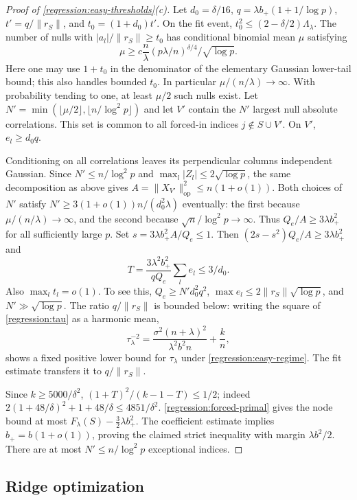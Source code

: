 \begin{proof}[Proof of \cref{regression:easy-thresholds}(c)]
Let $d_0=\delta/16$, $q=\lambda b_+(1+1/\log p)$,
$t'=q/\|r_S\|$, and $t_0=(1+d_0)t'$.
On the fit event, $t_0^2\leq(2-\delta/2)\Lambda_\lambda$.
The number of nulls with $|a_l|/\|r_S\|\geq t_0$ has conditional
binomial mean $\mu$ satisfying
\[
 \mu\geq c\frac n\lambda
                 (p\lambda/n)^{\delta/4}/\sqrt{\log p}.
\]
Here one may use $1+t_0$ in the denominator of the elementary
Gaussian lower-tail bound; this also handles bounded $t_0$.
In particular $\mu/(n/\lambda)\to\infty$.
With probability tending to one, at least $\mu/2$ such nulls exist.
Let $N'=\min(\lfloor\mu/2\rfloor,\lfloor n/\log^2p\rfloor)$
and let $V'$ contain the $N'$ largest null absolute correlations.
This set is common to all forced-in indices $j\notin S\cup V'$.
On $V'$, $e_l\geq d_0q$.

Conditioning on all correlations leaves its perpendicular columns
independent Gaussian. Since $N'\leq n/\log^2p$ and
$\max_l|Z_l|\leq2\sqrt{\log p}$, the same decomposition as above gives
$A=\|X_{V'}\|_{\mathrm{op}}^2\leq n(1+o(1))$.
Both choices of $N'$ satisfy
$N'\geq3(1+o(1))n/(d_0^2\lambda)$ eventually:
the first because $\mu/(n/\lambda)\to\infty$, and the second because
$\sqrt n/\log^2p\to\infty$.
Thus $Q_e/A\geq3\lambda b_+^2$ for all sufficiently large $p$.
Set $s=3\lambda b_+^2A/Q_e\leq1$.
Then $(2s-s^2)Q_e/A\geq3\lambda b_+^2$ and
\[
 T=\frac{3\lambda^2b_+^2}{qQ_e}\sum_le_l\leq3/d_0.
\]
Also $\max_lt_l=o(1)$. To see this, $Q_e\geq N'd_0^2q^2$,
$\max e_l\leq2\|r_S\|\sqrt{\log p}$, and
$N'\gg\sqrt{\log p}$. The ratio $q/\|r_S\|$ is bounded below:
writing the square of \eqref{regression:tau} as a harmonic mean,
\[
 \tau_\lambda^{-2}
 =\frac{\sigma^2(n+\lambda)^2}{\lambda^2b^2n}+\frac kn,
\]
shows a fixed positive lower bound for $\tau_\lambda$ under
\eqref{regression:easy-regime}. The fit estimate transfers it to
$q/\|r_S\|$.

Since $k\geq5000/\delta^2$,
$(1+T)^2/(k-1-T)\leq1/2$; indeed
$2(1+48/\delta)^2+1+48/\delta\leq4851/\delta^2$.
\cref{regression:forced-primal} gives the node bound at most
$F_\lambda(S)-\tfrac32\lambda b_+^2$.
The coefficient estimate implies $b_+=b(1+o(1))$, proving the
claimed strict inequality with margin $\lambda b^2/2$.
There are at most $N'\leq n/\log^2p$ exceptional indices.
\end{proof}

\subsection{Ridge optimization}
\label{app:regression:sample-sizes}


